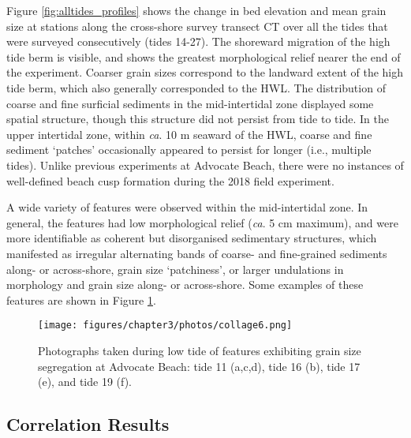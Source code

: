 \documentclass[jmse,article,submit,pdftex,moreauthors]{Definitions/mdpi}
\begin{document}
Figure \ref{fig:alltides_profiles} shows the change in bed elevation and mean grain size at stations along the cross-shore survey transect CT over all the tides that were surveyed consecutively (tides 14-27). The shoreward migration of the high tide berm is visible, and shows the greatest morphological relief nearer the end of the experiment. Coarser grain sizes correspond to the landward extent of the high tide berm, which also generally corresponded to the HWL. The distribution of coarse and fine surficial sediments in the mid-intertidal zone displayed some spatial structure, though this structure did not persist from tide to tide. In the upper intertidal zone, within \textit{ca}. 10 m seaward of the HWL, coarse and fine sediment `patches' occasionally appeared to persist for longer (i.e., multiple tides). Unlike previous experiments at Advocate Beach, there were no instances of well-defined beach cusp formation during the 2018 field experiment. 

A wide variety of features were observed within the mid-intertidal zone. In general, the features had low morphological relief (\textit{ca}. 5 cm maximum), and were more identifiable as coherent but disorganised sedimentary structures, which manifested as irregular alternating bands of coarse- and fine-grained sediments along- or across-shore, grain size `patchiness', or larger undulations in morphology and grain size along- or across-shore. Some examples of these features are shown in Figure \ref{fig:patchiness_photo3}.

\begin{figure}[tbp] %
	\texttt{[image: figures/chapter3/photos/collage6.png]}
	\caption[Photographs of grain size segregation at Advocate Beach]{Photographs taken during low tide of features exhibiting grain size segregation at Advocate Beach: tide 11 (a,c,d), tide 16 (b), tide 17 (e), and tide 19 (f).}
	\label{fig:patchiness_photo3}
\end{figure}



\subsection{Correlation Results}\label{Results:Correlation}
\end{document}
